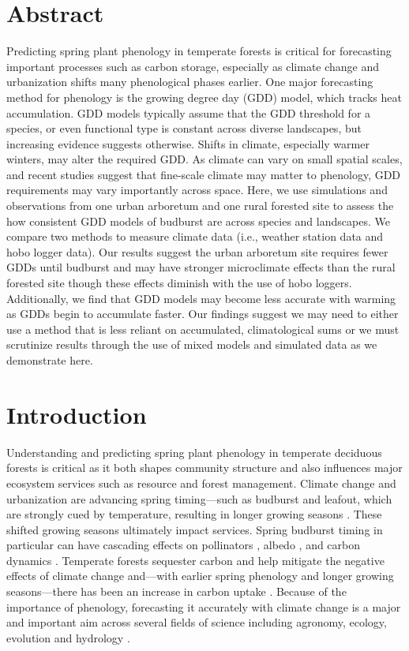 \documentclass{article}\usepackage[]{graphicx}\usepackage[]{color}
\begin{document}
\newpage
\section*{Abstract} %
Predicting spring plant phenology in temperate forests is critical for forecasting important processes such as carbon storage, especially as climate change and urbanization shifts many phenological phases earlier. One major forecasting method for phenology is the growing degree day (GDD) model, which tracks heat accumulation. GDD models typically assume that the GDD threshold for a species, or even functional type is constant across diverse landscapes, but increasing evidence suggests otherwise. Shifts in climate, especially warmer winters, may alter the required GDD. As climate can vary on small spatial scales, and recent studies suggest that fine-scale climate may matter to phenology, GDD requirements may vary importantly across space. Here, we use simulations and observations from one urban arboretum and one rural forested site to assess the how consistent GDD models of budburst are across species and landscapes. We compare two methods to measure climate data (i.e., weather station data and hobo logger data). Our results suggest the urban arboretum site requires fewer GDDs until budburst and may have stronger microclimate effects than the rural forested site though these effects diminish with the use of hobo loggers. Additionally, we find that GDD models may become less accurate with warming as GDDs begin to accumulate faster. Our findings suggest we may need to either use a method that is less reliant on accumulated, climatological sums or we must scrutinize results through the use of mixed models and simulated data as we demonstrate here.

\section*{Introduction}

Understanding and predicting spring plant phenology in temperate deciduous forests is critical as it both shapes community structure and also influences major ecosystem services such as resource and forest management. Climate change and urbanization are advancing spring timing---such as budburst and leafout, which are strongly cued by temperature, resulting in longer growing seasons \citep{Chuine2001}. These shifted growing seasons ultimately impact services. Spring budburst timing in particular can have cascading effects on pollinators \citep{Boggs2012, Pardee2017}, albedo \citep{Williamson2016}, and carbon dynamics \citep{Richardson2013}. Temperate forests sequester carbon and help mitigate the negative effects of climate change and---with earlier spring phenology and longer growing seasons---there has been an increase in carbon uptake \citep{Keenan2014}. Because of the importance of phenology, forecasting it accurately with climate change is a major and important aim across several fields of science including agronomy, ecology, evolution and hydrology \citep{Bolton2013,Moorcroft2001,Taylor2020,Yu2016}. 
  
\end{document}
